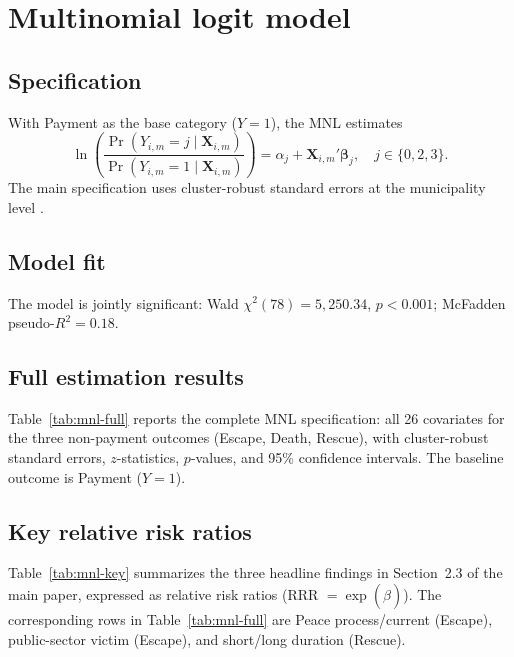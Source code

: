 \documentclass[ecta,nameyear,final,supplement]{econsocart}
\numberwithin{equation}{section}
\numberwithin{table}{section}
\begin{document}
\section{Multinomial logit model}
\label{sec:mnl}

\subsection{Specification}

With Payment as the base category ($Y=1$), the MNL estimates
\begin{equation}
\ln\!\left(\frac{\Pr(Y_{i,m}=j \mid \mathbf{X}_{i,m})}{\Pr(Y_{i,m}=1 \mid \mathbf{X}_{i,m})}\right)
= \alpha_j + \mathbf{X}_{i,m}'\boldsymbol{\beta}_j,
\quad j\in\{0,2,3\}.
\label{eq:mnl-app}
\end{equation}
The main specification uses cluster-robust standard errors at the municipality
level \citep{Wooldridge2010}.

\subsection{Model fit}

The model is jointly significant: Wald $\chi^2(78)=5{,}250.34$, $p<0.001$;
McFadden pseudo-$R^2=0.18$.

\subsection{Full estimation results}

Table~\ref{tab:mnl-full} reports the complete MNL specification: all 26
covariates for the three non-payment outcomes (Escape, Death, Rescue), with
cluster-robust standard errors, $z$-statistics, $p$-values, and 95\%
confidence intervals. The baseline outcome is Payment ($Y=1$).



\subsection{Key relative risk ratios}

Table~\ref{tab:mnl-key} summarizes the three headline findings in Section~2.3
of the main paper, expressed as relative risk ratios (RRR $=\exp(\hat\beta)$).
The corresponding rows in Table~\ref{tab:mnl-full} are Peace process/current
(Escape), public-sector victim (Escape), and short/long duration (Rescue).
\end{document}
